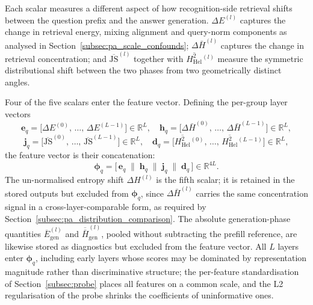 Each scalar measures a different aspect of how recognition-side retrieval
shifts between the question prefix and the answer generation.
$\Delta E^{(l)}$ captures the change in retrieval energy, mixing alignment
and query-norm components as analysed in
Section~\ref{subsec:pa_scale_confounds}; $\Delta \bar{H}^{(l)}$ captures the
change in retrieval concentration; and $\overline{\mathrm{JS}}^{(l)}$
together with $\overline{H^2_{\mathrm{Hel}}}{}^{(l)}$ measure the symmetric
distributional shift between the two phases from two geometrically distinct
angles.

Four of the five scalars enter the feature vector. Defining the per-group
layer vectors
\begin{equation}
    \mathbf{e}_q = \bigl[\Delta E^{(0)},\,\ldots,\,\Delta E^{(L-1)}\bigr]
                   \in \mathbb{R}^{L},
    \quad
    \mathbf{h}_q = \bigl[\Delta\bar{H}^{(0)},\,\ldots,\,
                   \Delta\bar{H}^{(L-1)}\bigr] \in \mathbb{R}^{L},
    \label{eq:group_vectors_1}
\end{equation}
\begin{equation}
    \mathbf{j}_q = \bigl[\overline{\mathrm{JS}}^{(0)},\,\ldots,\,
                   \overline{\mathrm{JS}}^{(L-1)}\bigr] \in \mathbb{R}^{L},
    \quad
    \mathbf{d}_q = \bigl[\overline{H^2_{\mathrm{Hel}}}{}^{(0)},\,\ldots,\,
                   \overline{H^2_{\mathrm{Hel}}}{}^{(L-1)}\bigr]
                   \in \mathbb{R}^{L},
    \label{eq:group_vectors_2}
\end{equation}
the feature vector is their concatenation:
\begin{equation}
    \boldsymbol{\phi}_q
    =
    \bigl[\,\mathbf{e}_q \;\|\; \mathbf{h}_q \;\|\; \mathbf{j}_q \;\|\;
    \mathbf{d}_q\,\bigr]
    \in \mathbb{R}^{4L}.
    \label{eq:feature_vector}
\end{equation}
The un-normalised entropy shift $\Delta H^{(l)}$ is the fifth scalar; it
is retained in the stored outputs but excluded from $\boldsymbol{\phi}_q$,
since $\Delta \bar{H}^{(l)}$ carries the same concentration signal in a
cross-layer-comparable form, as required by
Section~\ref{subsec:pa_distribution_comparison}. The absolute
generation-phase quantities $\overline{E}^{(l)}_{\mathrm{gen}}$ and
$\overline{\bar{H}}^{(l)}_{\mathrm{gen}}$, pooled without subtracting the
prefill reference, are likewise stored as diagnostics but excluded from the
feature vector. All $L$ layers enter $\boldsymbol{\phi}_q$, including early
layers whose scores may be dominated by representation magnitude rather
than discriminative structure; the per-feature standardisation of
Section~\ref{subsec:probe} places all features on a common scale, and the
L2 regularisation of the probe shrinks the coefficients of uninformative
ones.
